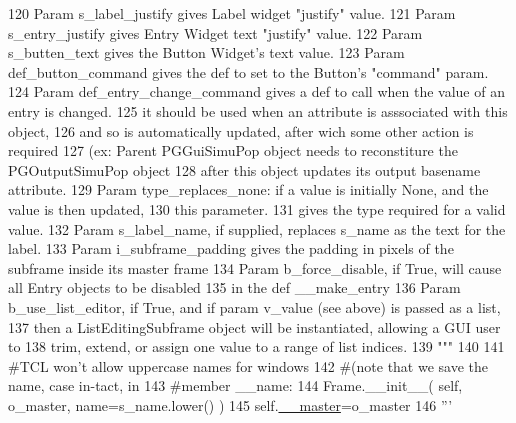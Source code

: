 \begin{DoxyCode}
120 \textcolor{stringliteral}{        Param s\_label\_justify gives Label widget "justify" value.}
121 \textcolor{stringliteral}{        Param s\_entry\_justify gives Entry Widget text "justify" value.}
122 \textcolor{stringliteral}{        Param s\_butten\_text gives the Button Widget's text value.}
123 \textcolor{stringliteral}{        Param def\_button\_command gives the def to set to the Button's "command" param.}
124 \textcolor{stringliteral}{        Param def\_entry\_change\_command gives a def to call when the value of an entry is changed.           
        }
125 \textcolor{stringliteral}{              it should be used when an attribute is asssociated with this object,}
126 \textcolor{stringliteral}{              and so is automatically updated, after wich some other action is required }
127 \textcolor{stringliteral}{              (ex: Parent PGGuiSimuPop object needs to reconstiture the PGOutputSimuPop object }
128 \textcolor{stringliteral}{              after this object updates its output basename attribute.}
129 \textcolor{stringliteral}{        Param type\_replaces\_none: if a value is initially None, and the value is then updated, }
130 \textcolor{stringliteral}{              this parameter.}
131 \textcolor{stringliteral}{              gives the type required for a valid value.}
132 \textcolor{stringliteral}{        Param s\_label\_name, if supplied, replaces s\_name as the text for the label.}
133 \textcolor{stringliteral}{        Param i\_subframe\_padding gives the padding in pixels of the subframe inside its master frame}
134 \textcolor{stringliteral}{        Param b\_force\_disable, if True, will cause all Entry objects to be disabled }
135 \textcolor{stringliteral}{              in the def \_\_make\_entry}
136 \textcolor{stringliteral}{        Param b\_use\_list\_editor, if True, and if param v\_value (see above) is passed as a list, }
137 \textcolor{stringliteral}{              then a ListEditingSubframe object will be instantiated, allowing a GUI user to}
138 \textcolor{stringliteral}{              trim, extend, or assign one value to a range of list indices.}
139 \textcolor{stringliteral}{        """}
140 
141         \textcolor{comment}{#TCL won't allow uppercase names for windows}
142         \textcolor{comment}{#(note that we save the name, case in-tact, in}
143         \textcolor{comment}{#member \_\_name:}
144         Frame.\_\_init\_\_( self, o\_master, name=s\_name.lower() )
145         self.\hyperlink{classnegui_1_1pgguiutilities_1_1KeyValFrame_a59eae02effdbbbb9e3cf3e523639e8a8}{\_\_master}=o\_master
146         \textcolor{stringliteral}{'''}

\end{DoxyCode}

